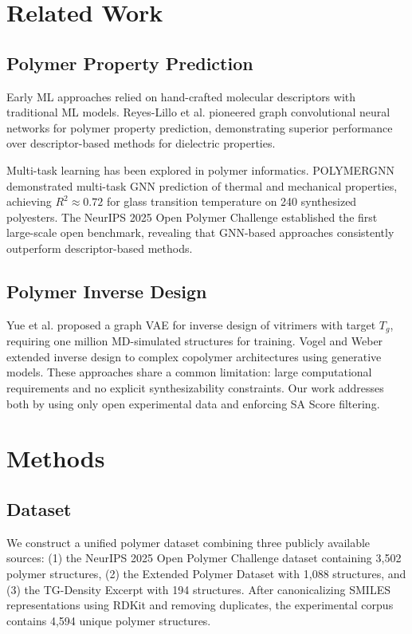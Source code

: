 \documentclass{article}
\begin{document}
\section{Related Work}

\subsection{Polymer Property Prediction}

Early ML approaches relied on hand-crafted molecular descriptors with traditional
ML models. Reyes-Lillo et al. \citep{gcnn_polymer_2018} pioneered graph convolutional neural networks
for polymer property prediction, demonstrating superior performance over
descriptor-based methods for dielectric properties.

Multi-task learning has been explored in polymer informatics.
POLYMERGNN \citep{polymergnn_2023} demonstrated multi-task GNN prediction
of thermal and mechanical properties, achieving $R^2 \approx 0.72$ for glass
transition temperature on 240 synthesized polyesters.
The NeurIPS 2025 Open Polymer Challenge \citep{neurips_opc_2025} established
the first large-scale open benchmark, revealing that GNN-based approaches
consistently outperform descriptor-based methods.

\subsection{Polymer Inverse Design}

Yue et al. \citep{vitrimer_inverse_2023} proposed a graph VAE for inverse design of vitrimers
with target $T_g$, requiring one million MD-simulated structures for training.
Vogel and Weber \citep{copolymer_inverse_2024} extended inverse design to complex copolymer
architectures using generative models.
These approaches share a common limitation: large computational requirements
and no explicit synthesizability constraints. Our work addresses both by using
only open experimental data and enforcing SA Score filtering.

\section{Methods}

\subsection{Dataset}

We construct a unified polymer dataset combining three publicly available sources:
(1) the NeurIPS 2025 Open Polymer Challenge dataset \citep{neurips_opc_2025} containing
3,502 polymer structures, (2) the Extended Polymer Dataset with 1,088 structures,
and (3) the TG-Density Excerpt with 194 structures. After canonicalizing SMILES
representations using RDKit and removing duplicates, the experimental corpus contains
4,594 unique polymer structures.
\end{document}

